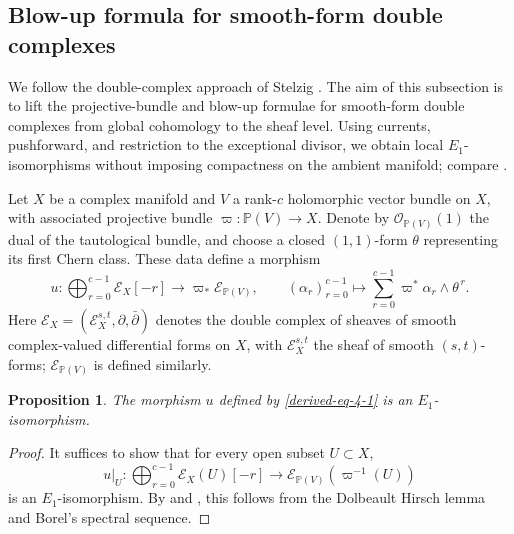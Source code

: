 \documentclass[11pt]{amsart}
\numberwithin{equation}{section}
\theoremstyle{plain}
\newtheorem{Pro}[thm]{Proposition}
\theoremstyle{definition}
\begin{document}
\subsection{Blow-up formula for smooth-form double complexes}

We follow the double-complex approach of Stelzig
\cite[\S\S~3 and~5]{Se21}.
The aim of this subsection is to lift the projective-bundle and blow-up
formulae for smooth-form double complexes from global cohomology to the
sheaf level.  Using currents, pushforward, and restriction to the exceptional
divisor, we obtain local $E_1$-isomorphisms without imposing compactness on
the ambient manifold; compare \cite[\S~5]{Se21}.

Let $X$ be a complex manifold and $V$ a rank-$c$ holomorphic vector bundle on
$X$, with associated projective bundle
$\varpi:\mathbb P(V)\longrightarrow X$.  Denote by
$\mathcal O_{\mathbb P(V)}(1)$ the dual of the tautological bundle, and
choose a closed $(1,1)$-form $\theta$ representing its first Chern class.
These data define a morphism
\begin{equation}\label{derived-eq-4-1}
u:\bigoplus_{r=0}^{c-1}\mathcal E_X[-r]
\longrightarrow \varpi_*\mathcal E_{\mathbb P(V)},
\qquad
(\alpha_r)_{r=0}^{c-1}\longmapsto
\sum_{r=0}^{c-1}\varpi^*\alpha_r\wedge\theta^{\,r}.
\end{equation}
Here $\mathcal E_X=(\mathcal E_X^{s,t},\partial,\bar\partial)$ denotes
the double complex of sheaves of smooth complex-valued differential forms
on $X$, with $\mathcal E_X^{s,t}$ the sheaf of smooth $(s,t)$-forms;
$\mathcal E_{\mathbb P(V)}$ is defined similarly.
\begin{Pro}\label{prop-smooth-projective-bundle}
The morphism $u$ defined by \eqref{derived-eq-4-1} is an $E_1$-isomorphism.
\end{Pro}
\begin{proof}
It suffices to show that for every open subset $U\subset X$,
\[u\vert_U: \bigoplus_{r=0}^{c-1} \mathcal E_X(U)[-r]
\longrightarrow \mathcal E_{\mathbb{P}(V)}(\varpi^{-1}(U)) \]
is an $E_1$-isomorphism.  By \cite[\S~3]{Se21} and \cite[\S~3]{RYY20}, this follows from the
Dolbeault Hirsch lemma and Borel's spectral sequence.
\end{proof}
\end{document}
